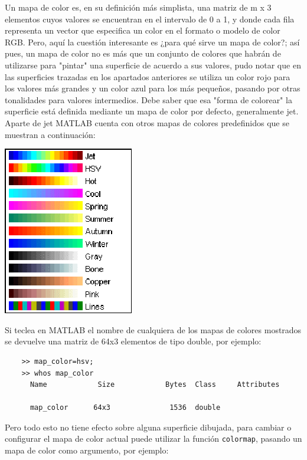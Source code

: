 Un mapa de color es, en su definición más simplista, una matriz de m x 3 elementos 
cuyos valores se encuentran en el intervalo de 0 a 1, y donde cada fila representa 
un vector que especifica un color en el formato o modelo de color RGB. Pero, aquí 
la cuestión interesante es ¿para qué sirve un mapa de color?; así pues, un mapa de 
color no es más que un conjunto de colores que habrán de utilizarse para "pintar" 
una superficie de acuerdo a sus valores, pudo notar que en las superficies trazadas 
en los apartados anteriores se utiliza un color rojo para los valores más grandes y 
un color azul para los más pequeños, pasando por otras tonalidades para valores 
intermedios. Debe saber que esa "forma de colorear" la superficie está definida 
mediante un mapa de color por defecto, generalmente jet. Aparte de jet MATLAB 
cuenta con otros mapas de colores predefinidos que se muestran a continuación:

\begin{center}
\includegraphics[scale=1]{src/ch4/img_4_9.png}
\end{center}

Si teclea en MATLAB el nombre de cualquiera de los mapas de colores mostrados se devuelve 
una matriz de 64x3 elementos de tipo double, por ejemplo:

\begin{verbatim}
	>> map_color=hsv;
	>> whos map_color
	  Name            Size            Bytes  Class     Attributes

	  map_color      64x3              1536  double          
\end{verbatim}

Pero todo esto no tiene efecto sobre alguna superficie dibujada, para cambiar o configurar 
el mapa de color actual puede utilizar la función \texttt{colormap}, pasando un mapa de color como 
argumento, por ejemplo:

